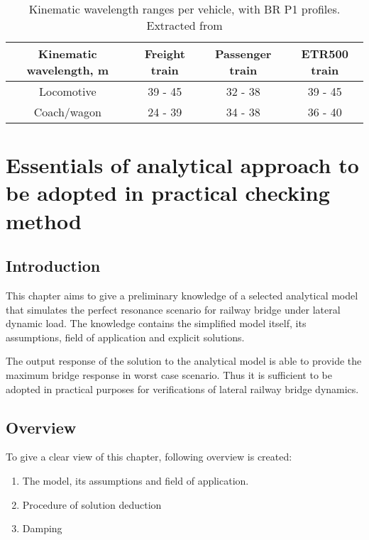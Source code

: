 \begin{appendices}
\begin{table}[h]
    \centering
    \begin{tabular}{c|c|c|c}
    \hline
    Kinematic wavelength, m & Freight train & Passenger train & ETR500 train \\
    \hline
    Locomotive & 39 - 45 & 32 - 38 & 39 - 45 \\
    Coach/wagon & 24 - 39 & 34 - 38 & 36 - 40 \\
    \hline
    \end{tabular}
    \caption{Kinematic wavelength ranges per vehicle, with BR P1 profiles. Extracted from \citet[Appendix C]{d181dt329}}
    \label{tab:329kinematicwavelength}
\end{table}

\chapter{Essentials of analytical approach to be adopted in practical checking method}\label{sec:analyticalmodel}
 
\section{Introduction}
This chapter aims to give a preliminary knowledge of a selected analytical model that simulates the perfect resonance scenario for railway bridge under lateral dynamic load. The knowledge contains the simplified model itself, its assumptions, field of application and explicit solutions. 

The output response of the solution to the analytical model is able to provide the maximum bridge response in worst case scenario. Thus it is sufficient to be adopted in practical purposes for verifications of lateral railway bridge dynamics.


\section{Overview}

To give a clear view of this chapter, following overview is created:

\begin{enumerate}
    \item The model, its assumptions and field of application. 
    \item Procedure of solution deduction
    \item Damping
\end{enumerate}


\end{appendices}
